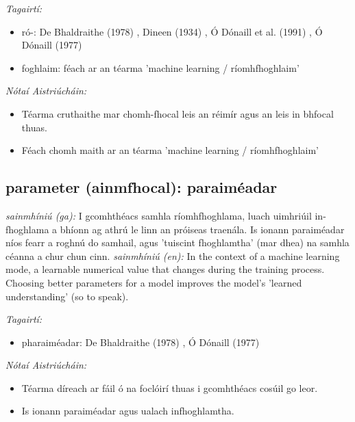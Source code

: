 \documentclass{article}
\begin{document}
 \noindent \textit{Tagairtí:}
\begin{itemize}
	\item ró-: De Bhaldraithe (1978) \cite{de-bhaldraithe}, Dineen (1934) \cite{dineen}, Ó Dónaill et al. (1991) \cite{focloir-beag}, Ó Dónaill (1977) \cite{odonaill}
	\item foghlaim: féach ar an téarma 'machine learning / ríomhfhoghlaim'
\end{itemize}

 \noindent \textit{Nótaí Aistriúcháin:}
\begin{itemize}
	\item Téarma cruthaithe mar chomh-fhocal leis an réimír agus an leis in bhfocal thuas.
	\item Féach chomh maith ar an téarma 'machine learning / ríomhfhoghlaim'
\end{itemize}


\subsection*{parameter (ainmfhocal): paraiméadar} 
 \noindent \textit{sainmhíniú (ga):} I gcomhthéacs samhla ríomhfhoghlama, luach uimhriúil in-fhoghlama a bhíonn ag athrú le linn an próiseas traenála. Is ionann paraiméadar níos fearr a roghnú do samhail, agus 'tuiscint fhoghlamtha' (mar dhea) na samhla céanna a chur chun cinn.
\newline\newline
 \noindent \textit{sainmhíniú (en):} In the context of a machine learning mode, a learnable numerical value that changes during the training process. Choosing better parameters for a model improves the model's 'learned understanding' (so to speak).
\newline

 \noindent \textit{Tagairtí:}
\begin{itemize}
	\item pharaiméadar: De Bhaldraithe (1978) \cite{de-bhaldraithe}, Ó Dónaill (1977) \cite{odonaill}
\end{itemize}

 \noindent \textit{Nótaí Aistriúcháin:}
\begin{itemize}
	\item Téarma díreach ar fáil ó na foclóirí thuas i gcomhthéacs cosúil go leor.
	\item Is ionann paraiméadar agus ualach infhoghlamtha.
\end{itemize}
\end{document}
